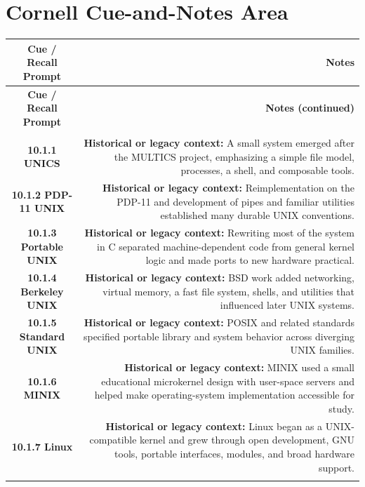 \documentclass[10pt,letterpaper]{article}
\begin{document}
\section*{Cornell Cue-and-Notes Area}
\small
\begin{longtable}{C N}
\color{white}\textbf{Cue / Recall Prompt} &
\color{white}\textbf{Notes}\\
\endfirsthead
{}
\color{white}\textbf{Cue / Recall Prompt} &
\color{white}\textbf{Notes (continued)}\\
\endhead
{}\\*\hline
\textbf{10.1.1 UNICS} & \textcolor{legacy}{\textbf{Historical or legacy context:}} A small system emerged after the MULTICS project, emphasizing a simple file model, processes, a shell, and composable tools.\\\hline
\textbf{10.1.2 PDP-11 UNIX} & \textcolor{legacy}{\textbf{Historical or legacy context:}} Reimplementation on the PDP-11 and development of pipes and familiar utilities established many durable UNIX conventions.\\\hline
\textbf{10.1.3 Portable UNIX} & \textcolor{legacy}{\textbf{Historical or legacy context:}} Rewriting most of the system in C separated machine-dependent code from general kernel logic and made ports to new hardware practical.\\\hline
\textbf{10.1.4 Berkeley UNIX} & \textcolor{legacy}{\textbf{Historical or legacy context:}} BSD work added networking, virtual memory, a fast file system, shells, and utilities that influenced later UNIX systems.\\\hline
\textbf{10.1.5 Standard UNIX} & \textcolor{legacy}{\textbf{Historical or legacy context:}} POSIX and related standards specified portable library and system behavior across diverging UNIX families.\\\hline
\textbf{10.1.6 MINIX} & \textcolor{legacy}{\textbf{Historical or legacy context:}} MINIX used a small educational microkernel design with user-space servers and helped make operating-system implementation accessible for study.\\\hline
\textbf{10.1.7 Linux} & \textcolor{legacy}{\textbf{Historical or legacy context:}} Linux began as a UNIX-compatible kernel and grew through open development, GNU tools, portable interfaces, modules, and broad hardware support.\\\hline
{}\\*\hline

\end{longtable}
\end{document}
